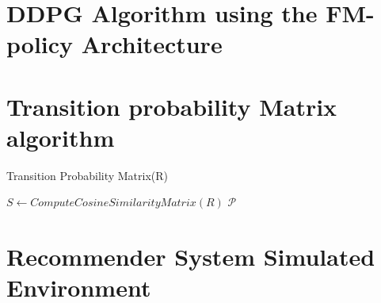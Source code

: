 
\chapter{DDPG Algorithm using the FM-policy Architecture}
\label{app:ddpgfm}

\appendix
\chapter{Transition probability Matrix algorithm}
\label{app:trans_prob_alg}

\begin{center}
 \begin{algorithm}[!htbp]
    \DontPrintSemicolon
    \caption{Transition Probability Matrix(R)}
    \label{alg:transition_matrix}
    
    $S \leftarrow ComputeCosineSimilarityMatrix(R)$\;
    \KwRet $\mathcal{P}$
  \end{algorithm}
\end{center}

\chapter{Recommender System Simulated Environment}
\label{app:simulated_env}

